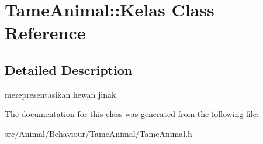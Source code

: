 \hypertarget{classTameAnimal_1_1Kelas}{\section{Tame\+Animal\+:\+:Kelas Class Reference}
\label{classTameAnimal_1_1Kelas}
}


\subsection{Detailed Description}
merepresentasikan hewan jinak. 

The documentation for this class was generated from the following file\+:\begin{DoxyCompactItemize}
\item 
src/\+Animal/\+Behaviour/\+Tame\+Animal/Tame\+Animal.\+h\end{DoxyCompactItemize}
